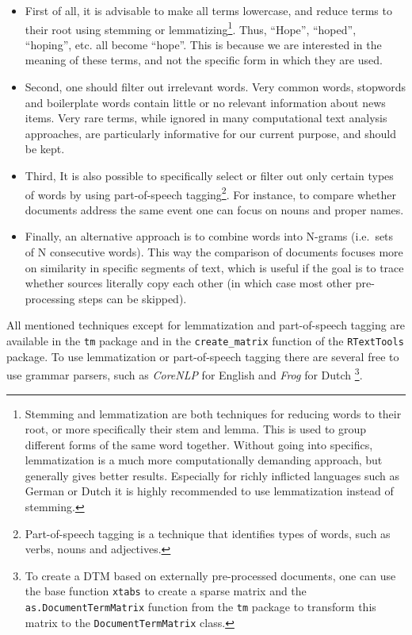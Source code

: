 \documentclass[]{article}
\let\rmarkdownfootnote\footnote%
\def\footnote{\protect\rmarkdownfootnote}
\begin{document}
\begin{itemize}
\item
  First of all, it is advisable to make all terms lowercase, and reduce
  terms to their root using stemming or lemmatizing\footnote{Stemming
    and lemmatization are both techniques for reducing words to their
    root, or more specifically their stem and lemma. This is used to
    group different forms of the same word together. Without going into
    specifics, lemmatization is a much more computationally demanding
    approach, but generally gives better results. Especially for richly
    inflicted languages such as German or Dutch it is highly recommended
    to use lemmatization instead of stemming.}. Thus, ``Hope'',
  ``hoped'', ``hoping'', etc. all become ``hope''. This is because we
  are interested in the meaning of these terms, and not the specific
  form in which they are used.
\item
  Second, one should filter out irrelevant words. Very common words,
  stopwords and boilerplate words contain little or no relevant
  information about news items. Very rare terms, while ignored in many
  computational text analysis approaches, are particularly informative
  for our current purpose, and should be kept.
\item
  Third, It is also possible to specifically select or filter out only
  certain types of words by using part-of-speech tagging\footnote{Part-of-speech
    tagging is a technique that identifies types of words, such as
    verbs, nouns and adjectives.}. For instance, to compare whether
  documents address the same event one can focus on nouns and proper
  names.
\item
  Finally, an alternative approach is to combine words into N-grams
  (i.e.~sets of N consecutive words). This way the comparison of
  documents focuses more on similarity in specific segments of text,
  which is useful if the goal is to trace whether sources literally copy
  each other (in which case most other pre-processing steps can be
  skipped).
\end{itemize}

All mentioned techniques except for lemmatization and part-of-speech
tagging are available in the \texttt{tm} package and in the
\texttt{create\_matrix} function of the \texttt{RTextTools} package. To
use lemmatization or part-of-speech tagging there are several free to
use grammar parsers, such as \emph{CoreNLP} for English \citep{corenlp}
and \emph{Frog} for Dutch \citep{bosch07}\footnote{To create a DTM based
  on externally pre-processed documents, one can use the base function
  \texttt{xtabs} to create a sparse matrix and the
  \texttt{as.DocumentTermMatrix} function from the \texttt{tm} package
  to transform this matrix to the \texttt{DocumentTermMatrix} class.}.
\end{document}

